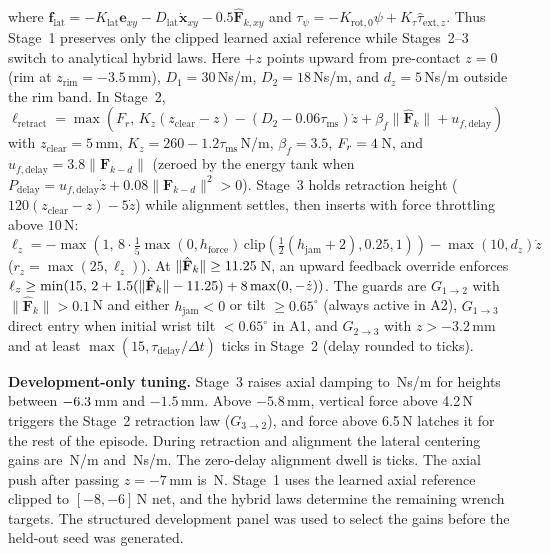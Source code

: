 \documentclass[letterpaper,10pt,conference]{IEEEtran}
\begin{document}
where $\mathbf{f}_{\mathrm{lat}}=-K_{\mathrm{lat}}\mathbf{e}_{xy}-D_{\mathrm{lat}}\dot{\mathbf{x}}_{xy}-0.5\hat{\mathbf F}_{k,xy}$ and $\tau_\psi=-K_{\mathrm{rot},0}\psi+K_\tau\hat\tau_{\mathrm{ext},z}$. Thus Stage~1 preserves only the clipped learned axial reference while Stages~2--3 switch to analytical hybrid laws. Here $+z$ points upward from pre-contact $z=0$ (rim at $z_{\mathrm{rim}}=-3.5$\,mm), $D_1=30$\,Ns/m, $D_2=18$\,Ns/m, and $d_z=5$\,Ns/m outside the rim band. In Stage~2, $\ell_{\mathrm{retract}}=\max(F_r,\,K_z(z_{\mathrm{clear}}-z)-(D_2-0.06\tau_{\mathrm{ms}})\dot z+\beta_f\|\hat{\mathbf F}_k\|+u_{f,\mathrm{delay}})$ with $z_{\mathrm{clear}}=5$\,mm, $K_z=260-1.2\tau_{\mathrm{ms}}$\,N/m, $\beta_f=3.5$, $F_r=4$\,N, and $u_{f,\mathrm{delay}}=3.8\|\mathbf F_{k-d}\|$ (zeroed by the energy tank when $P_{\mathrm{delay}}=u_{f,\mathrm{delay}}\dot z+0.08\|\mathbf F_{k-d}\|^2>0$). Stage~3 holds retraction height ($120(z_{\mathrm{clear}}-z)-5\dot z$) while alignment settles, then inserts with force throttling above $10$\,N: $\ell_z=-\max(1,\,8\cdot\tfrac15\max(0,h_{\mathrm{force}})\,\mathrm{clip}(\tfrac12(h_{\mathrm{jam}}+2),0.25,1))-\max(10,d_z)\dot z$ ($r_z=\max(25,\ell_z)$). At $\|\hat{\mathbf F}_k\|\ge11.25$\,N, an upward feedback override enforces $\ell_z\ge\min(15,\,2+1.5(\|\hat{\mathbf F}_k\|-11.25)+8\max(0,-\dot z))$. The guards are $G_{1\to2}$ with $\|\hat{\mathbf F}_k\|>0.1$\,N and either $h_{\mathrm{jam}}<0$ or tilt $\ge0.65^\circ$ (always active in A2), $G_{1\to3}$ direct entry when initial wrist tilt $<0.65^\circ$ in A1, and $G_{2\to3}$ with $z>-3.2$\,mm and at least $\max(15,\tau_{\mathrm{delay}}/\Delta t)$ ticks in Stage~2 (delay rounded to ticks).

\textbf{Development-only tuning.} Stage~3 raises axial damping to \RimDamping\,Ns/m for heights between $-6.3$\,mm and $-1.5$\,mm. Above $-5.8$\,mm, vertical force above 4.2\,N triggers the Stage~2 retraction law ($G_{3\to2}$), and force above 6.5\,N latches it for the rest of the episode. During retraction and alignment the lateral centering gains are \CenterK\,N/m and \CenterD\,Ns/m. The zero-delay alignment dwell is \SettleTicks{} ticks. The axial push after passing $z=-7$\,mm is \DeepPush\,N. Stage~1 uses the learned axial reference clipped to $[-8,-6]$\,N net, and the hybrid laws determine the remaining wrench targets. The structured development panel was used to select the gains before the held-out seed was generated.
\end{document}
